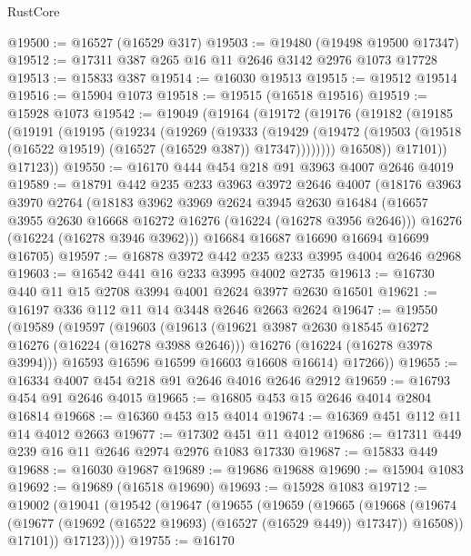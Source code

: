 \begin{lexlean}{RustCore}
\begin{coremodule}
@19500 := @16527 (@16529 @317)
@19503 := @19480 (@19498 @19500 @17347)
@19512 := @17311 @387 @265 @16 @11 @2646 @3142 @2976 @1073 @17728
@19513 := @15833 @387
@19514 := @16030 @19513
@19515 := @19512 @19514
@19516 := @15904 @1073
@19518 := @19515 (@16518 @19516)
@19519 := @15928 @1073
@19542 := @19049
    (@19164
      (@19172
        (@19176
          (@19182
            (@19185
              (@19191
                (@19195
                  (@19234
                    (@19269
                      (@19333
                        (@19429
                          (@19472
                            (@19503 (@19518 (@16522 @19519) (@16527 (@16529 @387)) @17347))))))))
                @16508))
            @17101))
        @17123))
@19550 := @16170 @444 @454 @218 @91 @3963 @4007 @2646 @4019
@19589 := @18791
    @442
    @235
    @233
    @3963
    @3972
    @2646
    @4007
    (@18176
      @3963
      @3970
      @2764
      (@18183
        @3962
        @3969
        @2624
        @3945
        @2630
        @16484
        (@16657 @3955 @2630 @16668 @16272 @16276 (@16224 (@16278 @3956 @2646)))
        @16276
        (@16224 (@16278 @3946 @3962)))
      @16684
      @16687
      @16690
      @16694
      @16699
      @16705)
@19597 := @16878 @3972 @442 @235 @233 @3995 @4004 @2646 @2968
@19603 := @16542 @441 @16 @233 @3995 @4002 @2735
@19613 := @16730 @440 @11 @15 @2708 @3994 @4001 @2624 @3977 @2630 @16501
@19621 := @16197 @336 @112 @11 @14 @3448 @2646 @2663 @2624
@19647 := @19550
    (@19589
      (@19597
        (@19603
          (@19613
            (@19621 @3987 @2630 @18545 @16272 @16276 (@16224 (@16278 @3988 @2646)))
            @16276
            (@16224 (@16278 @3978 @3994)))
          @16593
          @16596
          @16599
          @16603
          @16608
          @16614)
        @17266))
@19655 := @16334 @4007 @454 @218 @91 @2646 @4016 @2646 @2912
@19659 := @16793 @454 @91 @2646 @4015
@19665 := @16805 @453 @15 @2646 @4014 @2804 @16814
@19668 := @16360 @453 @15 @4014
@19674 := @16369 @451 @112 @11 @14 @4012 @2663
@19677 := @17302 @451 @11 @4012
@19686 := @17311 @449 @239 @16 @11 @2646 @2974 @2976 @1083 @17330
@19687 := @15833 @449
@19688 := @16030 @19687
@19689 := @19686 @19688
@19690 := @15904 @1083
@19692 := @19689 (@16518 @19690)
@19693 := @15928 @1083
@19712 := @19002
    (@19041
      (@19542
        (@19647
          (@19655
            (@19659
              (@19665
                (@19668
                  (@19674 (@19677 (@19692 (@16522 @19693) (@16527 (@16529 @449)) @17347)) @16508))
                @17101))
            @17123))))
@19755 := @16170

\end{coremodule}
\end{lexlean}

